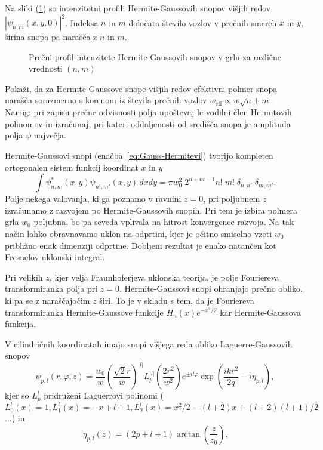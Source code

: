 Na sliki (\ref{fig:Gauss-Hermitevi-snopi}) so intenzitetni profili 
Hermite-Gaussovih snopov višjih redov $|\psi_{n,m}(x, y, 0)|^2$.
Indeksa $n$ in $m$ določata število vozlov v prečnih smereh $x$ in $y$,
širina snopa pa narašča z $n$ in $m$. 

\begin{figure}[h]
\centering
\def\svgwidth{90truemm} 

\caption{Prečni profil intenzitete Hermite-Gaussovih snopov v grlu 
za različne vrednosti $(n,m)$}
\label{fig:Gauss-Hermitevi-snopi}
\end{figure}

\begin{definition}
\label{naloga:HG}
Pokaži, da za Hermite-Gaussove snope višjih redov efektivni polmer snopa 
narašča sorazmerno s korenom iz števila prečnih vozlov $ w_{\mathrm{eff}}\propto w\sqrt{n+m}$.\\
Namig: pri zapisu prečne odvisnosti polja upoštevaj le vodilni člen Hermitovih polinomov 
in izračunaj, pri kateri oddaljenosti od središča snopa je amplituda polja $\psi$ največja.
\end{definition}

\begin{remark}
 Hermite-Gaussovi snopi (enačba~\ref{eq:Gauss-Hermitevi}) tvorijo kompleten
ortogonalen sistem funkcij koordinat $x$ in $y$
\begin{equation}
\int\psi_{n,m}^{*}(x,y)\psi_{n',m'}(x,y)\, dx dy=\pi w_{0}^{2}\; 
2^{n+m-1}n!\;m!\; \delta_{n,n'}\;\delta_{m,m'}.
\end{equation}
Polje nekega valovanja, ki ga poznamo v ravnini $z=0$, pri
poljubnem $z$ izračunamo z razvojem po Hermite-Gaussovih snopih. Pri tem
je izbira polmera grla $w_{0}$ poljubna, bo pa seveda vplivala na
hitrost konvergence razvoja. Na tak način lahko obravnavamo uklon
na odprtini, kjer je očitno smiselno vzeti $w_{0}$ približno enak
dimenziji odprtine. Dobljeni rezultat je enako natančen kot Fresnelov
uklonski integral.

Pri velikih $z$, kjer velja Fraunhoferjeva uklonska teorija, je
polje Fouriereva transformiranka polja pri $z=0$. Hermite-Gaussovi
snopi ohranjajo prečno obliko, ki pa se z naraščajočim $z$ širi. 
To je v skladu s tem, da je Fouriereva transformiranka Hermite-Gaussove funkcije 
$H_{n}(x)e^{-x^{2}/2}$ kar Hermite-Gaussova funkcija.
\end{remark}

V cilindričnih koordinatah imajo snopi višjega reda obliko Laguerre-Gaussovih 
snopov
\begin{equation}
\psi_{p,l}(r,\varphi,z)=\frac{w_{0}}{w}\left(\frac{\sqrt{2}r}{w}\right)^{|l|}
L_{p}^{|l|}\left(\frac{2r^{2}}{w^{2}}\right)e^{\pm il\varphi}\exp\left(\frac{ikr^{2}}{2q}-i\eta_{p,l}\right),
\label{eq:Gauss-Laguerrevi}
\end{equation}
kjer so $L_{p}^{l}$ pridruženi Laguerrovi polinomi ($L_{0}^{l}(x) = 1, 
L_{1}^{l}(x) = -x+l+1, 
L_{2}^{l}(x) = x^2/2-(l+2)x+(l+2)(l+1)/2
$ ...) in 
\begin{equation}
\eta_{p,l}\left(z\right)=(2p+l+1)\arctan\left(\frac{z}{z_{0}}\right).
\label{eq:etaGL}
\end{equation}

